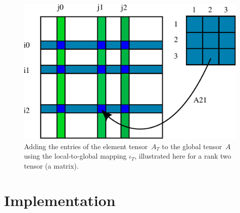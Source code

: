 \begin{figure}
  \begin{center}
    \includegraphics[width=12cm]{chapters/logg-3/pdf/insertion.pdf}
    \caption{Adding the entries of the element tensor~$A_T$ to the
      global tensor~$A$ using the  local-to-global mapping
      $\iota_T$, illustrated here for a rank two
      tensor (a matrix).}
    \label{fig:insertion}
  \end{center}
\end{figure}

\section{Implementation}


